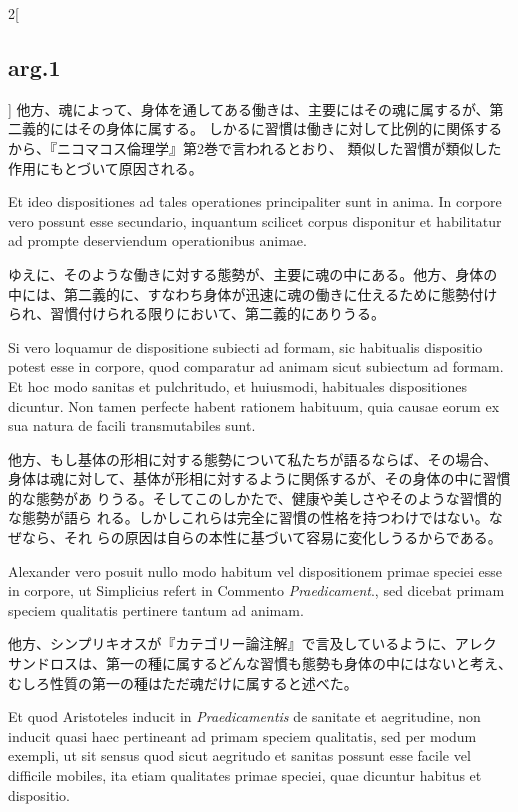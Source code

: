 \documentclass[paper=a4paper,fontsize=10pt,jafontsize=9pt,titlepage]{jlreq}
\begin{document}
\begin{paracol}{2}[\subsection{arg.1}]
他方、魂によって、身体を通してある働きは、主要にはその魂に属するが、第二義的にはその身体に属する。
しかるに習慣は働きに対して比例的に関係するから、『ニコマコス倫理学』第2巻で言われるとおり、
類似した習慣が類似した作用にもとづいて原因される。

\switchcolumn*

Et ideo dispositiones ad tales operationes principaliter sunt
in anima. In corpore vero possunt esse secundario, inquantum scilicet
corpus disponitur et habilitatur ad prompte deserviendum operationibus
animae.

\switchcolumn

ゆえに、そのような働きに対する態勢が、主要に魂の中にある。他方、身体の
中には、第二義的に、すなわち身体が迅速に魂の働きに仕えるために態勢付け
られ、習慣付けられる限りにおいて、第二義的にありうる。

\switchcolumn*

Si vero loquamur de dispositione subiecti ad formam, sic habitualis
dispositio potest esse in corpore, quod comparatur ad animam sicut
subiectum ad formam. Et hoc modo sanitas et pulchritudo, et huiusmodi,
habituales dispositiones dicuntur. Non tamen perfecte habent rationem
habituum, quia causae eorum ex sua natura de facili transmutabiles
sunt.

\switchcolumn

他方、もし基体の形相に対する態勢について私たちが語るならば、その場合、
身体は魂に対して、基体が形相に対するように関係するが、その身体の中に習慣的な態勢があ
りうる。そしてこのしかたで、健康や美しさやそのような習慣的な態勢が語ら
れる。しかしこれらは完全に習慣の性格を持つわけではない。なぜなら、それ
らの原因は自らの本性に基づいて容易に変化しうるからである。

\switchcolumn*

Alexander vero posuit nullo modo habitum vel dispositionem primae
speciei esse in corpore, ut Simplicius refert in Commento
{\itshape Praedicament}., sed dicebat primam speciem qualitatis pertinere tantum
ad animam.

\switchcolumn

他方、シンプリキオスが『カテゴリー論注解』で言及しているように、アレク
サンドロスは、第一の種に属するどんな習慣も態勢も身体の中にはないと考え、
むしろ性質の第一の種はただ魂だけに属すると述べた。

\switchcolumn*

Et quod Aristoteles inducit in {\itshape Praedicamentis} de sanitate
et aegritudine, non inducit quasi haec pertineant ad primam speciem
qualitatis, sed per modum exempli, ut sit sensus quod sicut aegritudo
et sanitas possunt esse facile vel difficile mobiles, ita etiam
qualitates primae speciei, quae dicuntur habitus et dispositio.


\end{paracol}
\end{document}
